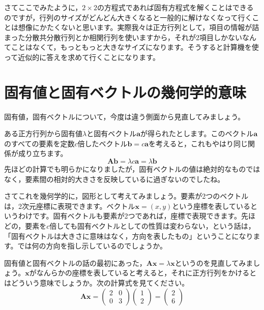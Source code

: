 \documentclass{ltjsbook}
\begin{document}
さてここでみたように，$2\times2$の方程式であれば固有方程式を解くことはできるのですが，行列のサイズがどんどん大きくなると一般的に解けなくなって行くことは想像にかたくないと思います。実際我々は正方行列として，項目の情報が詰まった分散共分散行列とか相関行列を使いますから，それが2項目しかないなんてことはなくて，もっともっと大きなサイズになります。そうすると計算機を使って近似的に答えを求めて行くことになります。

\section{固有値と固有ベクトルの幾何学的意味}

固有値，固有ベクトルについて，今度は違う側面から見直してみましょう。

ある正方行列から固有値$\lambda$と固有ベクトル$\bm{a}$が得られたとします。このベクトル$\bm{a}$のすべての要素を定数$c$倍したベクトル$\bm{b}=c\bm{a}$を考えると，これもやはり同じ関係が成り立ちます。
\begin{equation}
    \bm{A}\bm{b}=  \lambda c \bm{a} =\lambda \bm{b}
\end{equation}
先ほどの計算でも明らかになりましたが，固有ベクトルの値は絶対的なものではなく，要素間の相対的大きさを反映しているに過ぎないのでしたね。

さてこれを幾何学的に，図形として考えてみましょう。要素が2つのベクトルは，2次元座標に表現できます。ベクトル$\bm{x}=(x,y)$という座標を表しているというわけです。固有ベクトルも要素が2つであれば，座標で表現できます。先ほどの，要素を$c$倍しても固有ベクトルとしての性質は変わらない，という話は，「固有ベクトルは大きさに意味はなく，方向を表したもの」ということになります。では何の方向を指し示しているのでしょうか。

固有値と固有ベクトルの話の最初にあった，$\bm{Ax}=\lambda\bm{x}$というのを見直してみましょう。$\bm{x}$がなんらかの座標を表していると考えると，それに正方行列をかけるとはどういう意味でしょうか。次の計算式を見てください。
\begin{equation}
    \bm{Ax}=
    \begin{pmatrix}
        2 & 0 \\
        0 & 3
    \end{pmatrix}
    \begin{pmatrix}
        1 \\
        2
    \end{pmatrix}
    =
    \begin{pmatrix}
        2 \\
        6
    \end{pmatrix}
\end{equation}
\end{document}
